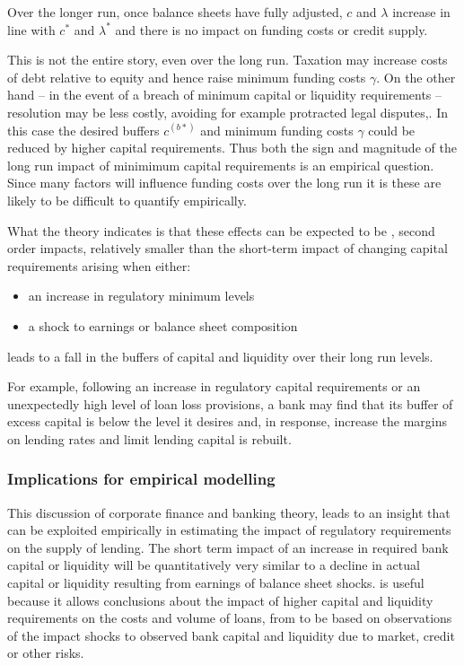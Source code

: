\documentclass[
  12,
]{article}
\begin{document}
Over the longer run, once balance sheets have fully adjusted, \(c\) and \(\lambda\) increase in line with \(c^\ast\) and \(\lambda^\ast\) and there is no impact on funding costs or credit supply.

This is not the entire story, even over the long run. Taxation may increase costs of debt relative to equity and hence raise minimum funding costs \(\gamma\). On the other hand -- in the event of a breach of minimum capital or liquidity requirements -- resolution may be less costly, avoiding for example protracted legal disputes,. In this case the desired buffers \(c^(b*)\) and minimum funding costs \(\gamma\) could be reduced by higher capital requirements. Thus both the sign and magnitude of the long run impact of minimimum capital requirements is an empirical question. Since many factors will influence funding costs over the long run it is these are likely to be difficult to quantify empirically.

What the theory indicates is that these effects can be expected to be , second order impacts, relatively smaller than the short-term impact of changing capital requirements arising when either:

\begin{itemize}
    \item an increase in regulatory minimum levels
    \item a shock to earnings or balance sheet composition
\end{itemize}

leads to a fall in the buffers of capital and liquidity over their long run levels.

For example, following an increase in regulatory capital requirements or an unexpectedly high level of loan loss provisions, a bank may find that its buffer of excess capital is below the level it desires and, in response, increase the margins on lending rates and limit lending capital is rebuilt.

\hypertarget{implications-for-empirical-modelling}{%
\subsubsection{Implications for empirical modelling}\label{implications-for-empirical-modelling}}

This discussion of corporate finance and banking theory, leads to an insight that can be exploited empirically in estimating the impact of regulatory requirements on the supply of lending. The short term impact of an increase in required bank capital or liquidity will be quantitatively very similar to a decline in actual capital or liquidity resulting from earnings of balance sheet shocks. is useful because it allows conclusions about the impact of higher capital and liquidity requirements on the costs and volume of loans, from to be based on observations of the impact shocks to observed bank capital and liquidity due to market, credit or other risks.
\end{document}
